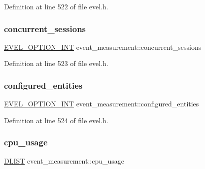 Definition at line 522 of file evel.\+h.

\hypertarget{structevent__measurement_a29075168af0c3f96b5606b1e707e3979}{}\label{structevent__measurement_a29075168af0c3f96b5606b1e707e3979} 
\subsubsection{\texorpdfstring{concurrent\+\_\+sessions}{concurrent\_sessions}}
{\footnotesize\ttfamily \hyperlink{evel_8h_a452d825778d1c2368a54b8f689a25ba7}{E\+V\+E\+L\+\_\+\+O\+P\+T\+I\+O\+N\+\_\+\+I\+NT} event\+\_\+measurement\+::concurrent\+\_\+sessions}



Definition at line 523 of file evel.\+h.

\hypertarget{structevent__measurement_aff8da1abcfbd005d70398418f8b12297}{}\label{structevent__measurement_aff8da1abcfbd005d70398418f8b12297} 
\subsubsection{\texorpdfstring{configured\+\_\+entities}{configured\_entities}}
{\footnotesize\ttfamily \hyperlink{evel_8h_a452d825778d1c2368a54b8f689a25ba7}{E\+V\+E\+L\+\_\+\+O\+P\+T\+I\+O\+N\+\_\+\+I\+NT} event\+\_\+measurement\+::configured\+\_\+entities}



Definition at line 524 of file evel.\+h.

\hypertarget{structevent__measurement_a1a727089e82e56bdd7d4a3aa6a55fa16}{}\label{structevent__measurement_a1a727089e82e56bdd7d4a3aa6a55fa16} 
\subsubsection{\texorpdfstring{cpu\+\_\+usage}{cpu\_usage}}
{\footnotesize\ttfamily \hyperlink{double__list_8h_a45f4a129042d9e1aa4ffd31fe13e4d14}{D\+L\+I\+ST} event\+\_\+measurement\+::cpu\+\_\+usage}



